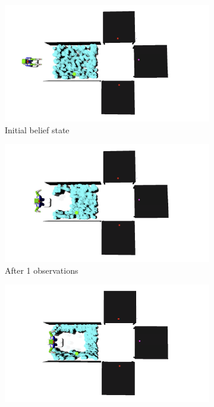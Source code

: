 \begin{figure}
  \centering
  \begin{subfigure}[b]{0.22\linewidth}
    \includegraphics[width=\textwidth]{corridor_images/0-observe.png}
    \caption{Initial belief state}
  \end{subfigure}
  \begin{subfigure}[b]{0.22\linewidth}
    \includegraphics[width=\textwidth]{corridor_images/1-observe.png}
    \caption{After 1 observations}
  \end{subfigure}
  \begin{subfigure}[b]{0.22\linewidth}
    \includegraphics[width=\textwidth]{corridor_images/2-observe.png}

\end{subfigure}
\end{figure}
